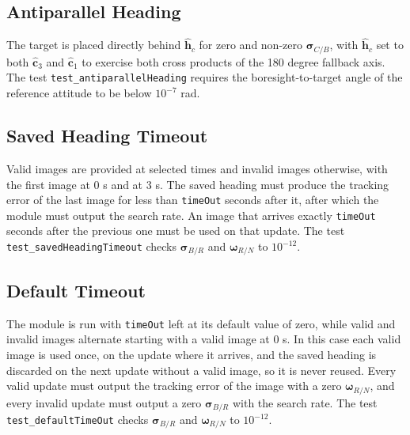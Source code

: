 \subsection{Antiparallel Heading}
The target is placed directly behind $\hat{\bm h}_{c}$ for zero and non-zero $\bm\sigma_{C/B}$, with $\hat{\bm h}_{c}$ set to both $\hat{\bm c}_{3}$ and $\hat{\bm c}_{1}$ to exercise both cross products of the 180 degree fallback axis.  The test {\tt test\_antiparallelHeading} requires the boresight-to-target angle of the reference attitude to be below $10^{-7}$ rad.

\subsection{Saved Heading Timeout}
Valid images are provided at selected times and invalid images otherwise, with the first image at 0 s and at 3 s.  The saved heading must produce the tracking error of the last image for less than {\tt timeOut} seconds after it, after which the module must output the search rate.  An image that arrives exactly {\tt timeOut} seconds after the previous one must be used on that update.  The test {\tt test\_savedHeadingTimeout} checks $\bm\sigma_{B/R}$ and $\bm\omega_{R/N}$ to $10^{-12}$.

\subsection{Default Timeout}
The module is run with {\tt timeOut} left at its default value of zero, while valid and invalid images alternate starting with a valid image at 0 s.  In this case each valid image is used once, on the update where it arrives, and the saved heading is discarded on the next update without a valid image, so it is never reused.  Every valid update must output the tracking error of the image with a zero $\bm\omega_{R/N}$, and every invalid update must output a zero $\bm\sigma_{B/R}$ with the search rate.  The test {\tt test\_defaultTimeOut} checks $\bm\sigma_{B/R}$ and $\bm\omega_{R/N}$ to $10^{-12}$.



